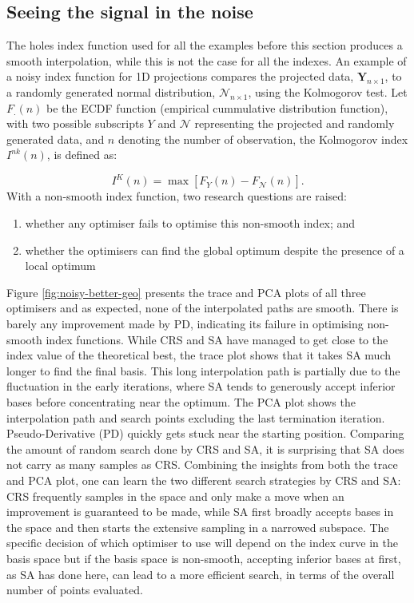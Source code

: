 \hypertarget{seeing-the-signal-in-the-noise}{%
\subsection{Seeing the signal in the
noise}\label{seeing-the-signal-in-the-noise}}

The holes index function used for all the examples before this section
produces a smooth interpolation, while this is not the case for all the
indexes. An example of a noisy index function for 1D projections
compares the projected data, \(\mathbf{Y}_{n \times 1}\), to a randomly
generated normal distribution, \(\mathcal{N}_{n \times 1}\), using the
Kolmogorov test. Let \(F_{.}(n)\) be the ECDF function (empirical
cummulative distribution function), with two possible subscripts \(Y\)
and \(\mathcal{N}\) representing the projected and randomly generated
data, and \(n\) denoting the number of observation, the Kolmogorov index
\(I^{nk}(n)\), is defined as:

\[I^{K}(n) = \max \left[F_{Y}(n) - F_{\mathcal{N}}(n)\right].\] With a
non-smooth index function, two research questions are raised:

\begin{enumerate}
\def\labelenumi{\arabic{enumi})}
\tightlist
\item
  whether any optimiser fails to optimise this non-smooth index; and
\item
  whether the optimisers can find the global optimum despite the
  presence of a local optimum
\end{enumerate}

Figure \ref{fig:noisy-better-geo} presents the trace and PCA plots of
all three optimisers and as expected, none of the interpolated paths are
smooth. There is barely any improvement made by PD, indicating its
failure in optimising non-smooth index functions. While CRS and SA have
managed to get close to the index value of the theoretical best, the
trace plot shows that it takes SA much longer to find the final basis.
This long interpolation path is partially due to the fluctuation in the
early iterations, where SA tends to generously accept inferior bases
before concentrating near the optimum. The PCA plot shows the
interpolation path and search points excluding the last termination
iteration. Pseudo-Derivative (PD) quickly gets stuck near the starting
position. Comparing the amount of random search done by CRS and SA, it
is surprising that SA does not carry as many samples as CRS. Combining
the insights from both the trace and PCA plot, one can learn the two
different search strategies by CRS and SA: CRS frequently samples in the
space and only make a move when an improvement is guaranteed to be made,
while SA first broadly accepts bases in the space and then starts the
extensive sampling in a narrowed subspace. The specific decision of
which optimiser to use will depend on the index curve in the basis space
but if the basis space is non-smooth, accepting inferior bases at first,
as SA has done here, can lead to a more efficient search, in terms of
the overall number of points evaluated.

